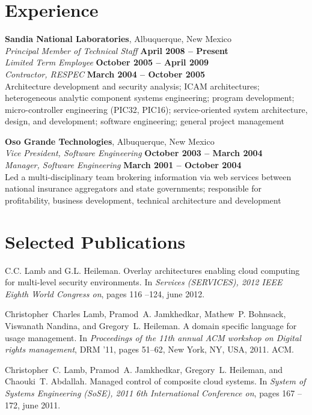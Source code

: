 \documentclass[margin,line]{resume}
\begin{document}
\begin{resume}
\section{\mysidestyle Experience}
{\bf Sandia National Laboratories}, Albuquerque, New Mexico \vspace{2mm} \\
{\sl Principal Member of Technical Staff} \hfill \textbf{April 2008 -- Present} \\
{\sl Limited Term Employee} \hfill \textbf{October 2005 -- April 2009} \\
{\sl Contractor, RESPEC} \hfill \textbf{March 2004 -- October 2005} \\
Architecture development and security analysis; ICAM architectures; heterogeneous analytic component systems engineering; program development; micro-controller engineering (PIC32, PIC16); service-oriented system architecture, design, and development; software engineering; general project management 

{\bf Oso Grande Technologies}, Albuquerque, New Mexico \vspace{2mm} \\
{\sl Vice President, Software Engineering} \hfill \textbf{October 2003 -- March 2004} \\
{\sl Manager, Software Engineering} \hfill \textbf{March 2001 -- October 2004} \\
Led a multi-disciplinary team brokering information via web services between national insurance aggregators and state governments; responsible for profitability, business development, technical architecture and development

\section{\mysidestyle Selected Publications}
C.C. Lamb and G.L. Heileman.
\newblock Overlay architectures enabling cloud computing for multi-level
  security environments.
\newblock In {\em Services (SERVICES), 2012 IEEE Eighth World Congress on},
  pages 116 --124, june 2012.

Christopher~Charles Lamb, Pramod~A. Jamkhedkar, Mathew~P. Bohnsack, Viswanath
  Nandina, and Gregory~L. Heileman.
\newblock A domain specific language for usage management.
\newblock In {\em Proceedings of the 11th annual ACM workshop on Digital rights
  management}, DRM '11, pages 51--62, New York, NY, USA, 2011. ACM.

Christopher~C. Lamb, Pramod~A. Jamkhedkar, Gregory~L. Heileman, and Chaouki~T.
  Abdallah.
\newblock Managed control of composite cloud systems.
\newblock In {\em System of Systems Engineering (SoSE), 2011 6th International
  Conference on}, pages 167 --172, june 2011.


\end{resume}
\end{document}
